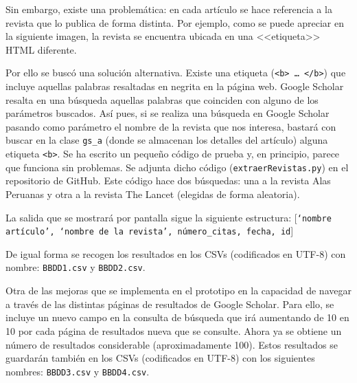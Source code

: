 
Sin embargo, existe una problemática: en cada artículo se hace referencia a la revista que lo publica de forma distinta. Por ejemplo, como se puede apreciar en la siguiente imagen, la revista se encuentra ubicada en una <<etiqueta>> HTML diferente.


Por ello se buscó una solución alternativa.
Existe una etiqueta (\texttt{<b> … </b>}) que incluye aquellas palabras resaltadas en negrita en la página web. Google Scholar resalta en una búsqueda aquellas palabras que coinciden con alguno de los parámetros buscados. Así pues, si se realiza una búsqueda en Google Scholar pasando como parámetro el nombre de la revista que nos interesa, bastará con buscar en la clase  \texttt{gs\_a} (donde se almacenan los detalles del artículo) alguna etiqueta \texttt{<b>}.
Se ha escrito un pequeño código de prueba y, en principio, parece que funciona sin problemas. Se adjunta dicho código (\texttt{extraerRevistas.py}) en el repositorio de GitHub. %
Este código hace dos búsquedas: una a la revista Alas Peruanas y otra a la revista The Lancet (elegidas de forma aleatoria).



La salida que se mostrará por pantalla sigue la siguiente estructura: [\texttt{‘nombre artículo’, ‘nombre de la revista’, número\_citas, fecha, id}]

De igual forma se recogen los resultados en los CSVs (codificados en UTF-8) con nombre: \texttt{BBDD1.csv} y \texttt{BBDD2.csv}.



Otra de las mejoras que se implementa en el prototipo en la capacidad de navegar a través de las distintas páginas de resultados de Google Scholar. Para ello, se incluye un nuevo campo en la consulta de búsqueda que irá aumentando de 10 en 10 por cada página de resultados nueva que se consulte.
Ahora ya se obtiene un número de resultados considerable (aproximadamente 100). Estos resultados se guardarán también en los CSVs (codificados en UTF-8) con los siguientes nombres: \texttt{BBDD3.csv} y \texttt{BBDD4.csv}.

